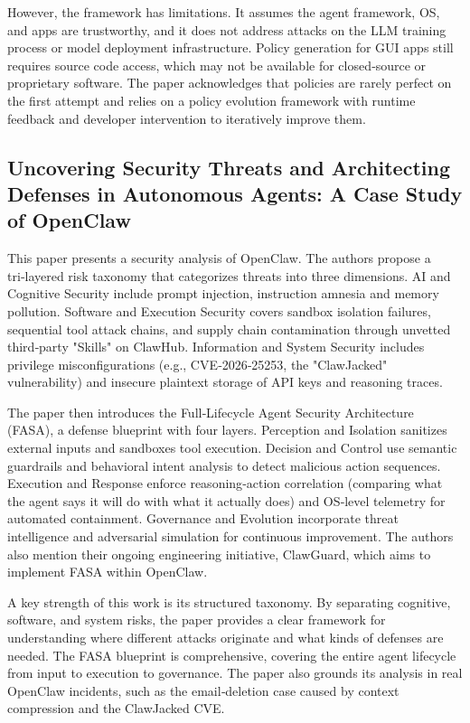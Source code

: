 \documentclass[a4paper]{report}
\begin{document}
However, the framework has limitations. It assumes the agent framework, OS, and apps are trustworthy, and it does not address attacks on the LLM training process or model deployment infrastructure. Policy generation for GUI apps still requires source code access, which may not be available for closed‑source or proprietary software. The paper acknowledges that policies are rarely perfect on the first attempt and relies on a policy evolution framework with runtime feedback and developer intervention to iteratively improve them.

\subsection{Uncovering Security Threats and Architecting Defenses in Autonomous Agents: A Case Study of OpenClaw}
This paper \cite{ying2026uncovering} presents a security analysis of OpenClaw. The authors propose a tri‑layered risk taxonomy that categorizes threats into three dimensions. AI and Cognitive Security include prompt injection, instruction amnesia and memory pollution. Software and Execution Security covers sandbox isolation failures, sequential tool attack chains, and supply chain contamination through unvetted third‑party "Skills" on ClawHub. Information and System Security includes privilege misconfigurations (e.g., CVE‑2026‑25253, the "ClawJacked" vulnerability) and insecure plaintext storage of API keys and reasoning traces.

The paper then introduces the Full‑Lifecycle Agent Security Architecture (FASA), a defense blueprint with four layers. Perception and Isolation sanitizes external inputs and sandboxes tool execution. Decision and Control use semantic guardrails and behavioral intent analysis to detect malicious action sequences. Execution and Response enforce reasoning‑action correlation (comparing what the agent says it will do with what it actually does) and OS‑level telemetry for automated containment. Governance and Evolution incorporate threat intelligence and adversarial simulation for continuous improvement. The authors also mention their ongoing engineering initiative, ClawGuard, which aims to implement FASA within OpenClaw.

A key strength of this work is its structured taxonomy. By separating cognitive, software, and system risks, the paper provides a clear framework for understanding where different attacks originate and what kinds of defenses are needed. The FASA blueprint is comprehensive, covering the entire agent lifecycle from input to execution to governance. The paper also grounds its analysis in real OpenClaw incidents, such as the email‑deletion case caused by context compression and the ClawJacked CVE.
\end{document}
